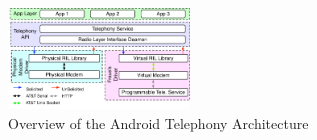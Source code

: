 \documentclass[conference]{IEEEtranl}
\begin{document}


	\begin{figure}[t]
	\begin{center}
	\includegraphics[width=0.43\textwidth]{Figures/rild}
	\caption{Overview of the Android Telephony Architecture}
	\label{fig:rild}
	\vspace{-0.4in}
	\end{center}
	\end{figure}


\end{document}
